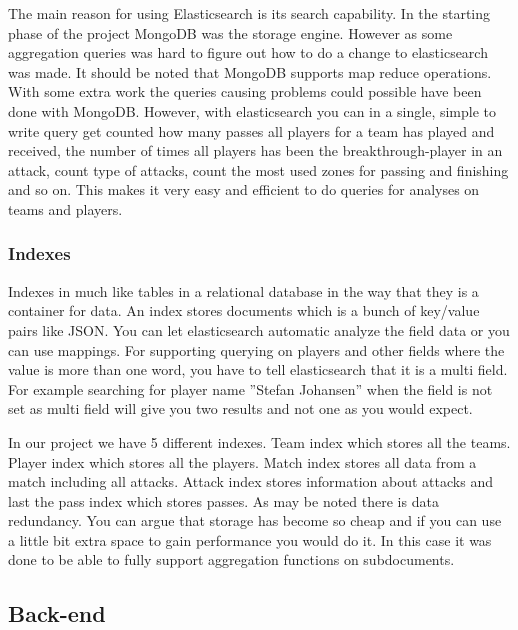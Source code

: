 The main reason for using Elasticsearch is its search capability. In the starting phase of the project MongoDB \footnotemark was the storage engine. However as some aggregation queries was hard to figure out how to do a change to elasticsearch was made. It should be noted that MongoDB supports map reduce operations. With some extra work the queries causing problems could possible have been done with MongoDB. However, with elasticsearch you can in a single, simple to write query get counted how many passes all players for a team has played and received, the number of times all players has been the breakthrough-player in an attack, count type of attacks, count the most used zones for passing and finishing and so on. This makes it very easy and efficient to do queries for analyses on teams and players.


\subsubsection{Indexes}

Indexes in much like tables in a relational database in the way that they is a container for data. An index stores documents which is a bunch of key/value pairs like JSON. You can let elasticsearch automatic analyze the field data or you can use mappings. For supporting querying on players and other fields where the value is more than one word, you have to tell elasticsearch that it is a multi field. For example searching for player name ''Stefan Johansen'' when the field is not set as multi field will give you two results and not one as you would expect.

In our project we have 5 different indexes. Team index which stores all the teams. Player index which stores all the players. Match index stores all data from a match including all attacks. Attack index stores information about attacks and last the pass index which stores passes. As may be noted there is data redundancy. You can argue that storage has become so cheap and if you can use a little bit extra space to gain performance you would do it. In this case it was done to be able to fully support aggregation functions on subdocuments.

\subsection{Back-end}


